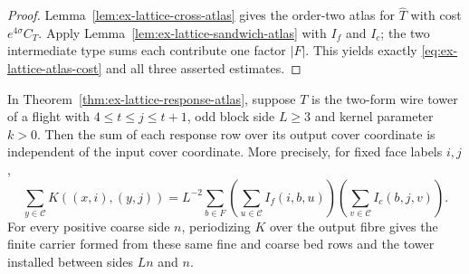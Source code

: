 \begin{proof}
Lemma~\ref{lem:ex-lattice-cross-atlas} gives the order-two atlas for
$\widehat T$ with cost $e^{4\sigma}C_T$. Apply
Lemma~\ref{lem:ex-lattice-sandwich-atlas} with $I_f$ and $I_c$; the two
intermediate type sums each contribute one factor $|F|$. This yields exactly
\eqref{eq:ex-lattice-atlas-cost} and all three asserted estimates.
\end{proof}

\begin{proposition}
\label{prop:ex-lattice-response-travel}
In Theorem~\ref{thm:ex-lattice-response-atlas}, suppose $T$ is the
two-form wire tower of a flight with $4\le t\le j\le t+1$,
odd block side $L\ge3$ and kernel parameter $k>0$. Then the sum of each response row over its output cover
coordinate is independent of the input cover coordinate. More precisely,
for fixed face labels $i,j$,
\[
 \sum_{y\in\mathcal C}K((x,i),(y,j))
 =L^{-2}\sum_{b\in F}
    \left(\sum_{u\in\mathcal C}I_f(i,b,u)\right)
    \left(\sum_{v\in\mathcal C}I_c(b,j,v)\right).
\]
For every positive coarse side $n$, periodizing $K$ over the output fibre
gives the finite carrier formed from these same fine and coarse bed rows and
the tower installed between sides $Ln$ and $n$.
\end{proposition}

